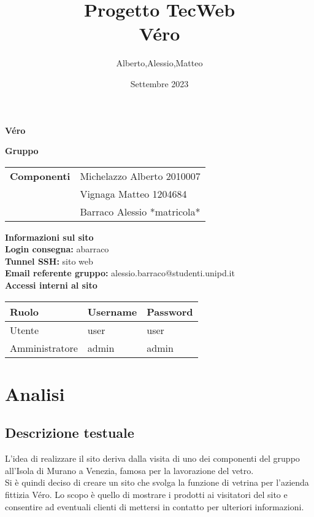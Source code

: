 \documentclass[a4paper, 11pt]{article}
\title{Progetto TecWeb \\ Véro}
\author{Alberto,Alessio,Matteo}
\date{Settembre 2023}
\begin{document}
\begin{center}
	\textbf{\Huge{Véro}}
\end{center}

\vspace{5pt}

\begin{center}
	\textbf{\Large{Gruppo}}
    \begin{table}[H]
        \hspace{3.5cm}
        \renewcommand{\arraystretch}{1.4}
        \begin{tabular}{l | l}
            \textbf{Componenti} & Michelazzo Alberto 2010007\\
            & Vignaga Matteo 1204684\\
            & Barraco Alessio *matricola*\\
        \end{tabular}
    \end{table}
\end{center}


\begin{center}
	\textbf{\Large{Informazioni sul sito}}\\
	\vspace{4pt}
	\textbf{Login consegna:} abarraco \\
	\textbf{Tunnel SSH:} sito web\\
	\textbf{Email referente gruppo:} alessio.barraco@studenti.unipd.it\\
    \vspace{1cm}
    \textbf{Accessi interni al sito}
    \begin{longtable}{|l|l|l|}
        \hline
        {Ruolo} & {Username} & {Password} \\ \hline
        Utente         & user     & user     \\ \hline
        Amministratore & admin    & admin \\ \hline
    \end{longtable}
\end{center}

\pagebreak
\tableofcontents
\pagebreak


\section{Analisi}
\subsection{Descrizione testuale}
L’idea di realizzare il sito deriva dalla visita di uno dei componenti del gruppo all’Isola di Murano a Venezia, famosa per la lavorazione del vetro. \\
Si è quindi deciso di creare un sito che svolga la funzione di vetrina per l’azienda fittizia Véro. Lo scopo è quello di mostrare i prodotti ai visitatori del sito e consentire ad eventuali clienti di mettersi in contatto per ulteriori informazioni. 
\end{document}
